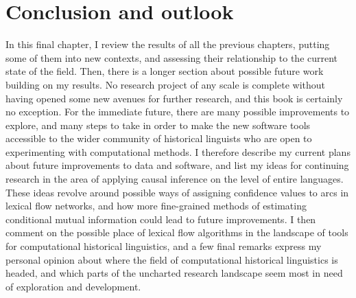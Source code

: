 \chapter{Conclusion and outlook}\label{sec:8}
In this final chapter, I review the results of all the previous chapters, putting some of them into new contexts, and assessing their relationship to the current state of the field. Then, there is a longer section about possible future work building on my results. No research project of any scale is complete without having opened some new avenues for further research, and this book is certainly no exception. For the immediate future, there are many possible improvements to explore, and many steps to take in order to make the new software tools accessible to the wider community of historical linguists who are open to experimenting with computational methods. I therefore describe my current plans about future improvements to data and software, and list my ideas for continuing research in the area of applying causal inference on the level of entire languages. These ideas revolve around possible ways of assigning confidence values to arcs in lexical flow networks, and how more fine-grained methods of estimating conditional mutual information could lead to future improvements. I then comment on the possible place of lexical flow algorithms in the landscape of tools for computational historical linguistics, and a few final remarks express my personal opinion about where the field of computational historical linguistics is headed, and which parts of the uncharted research landscape seem most in need of exploration and development.

